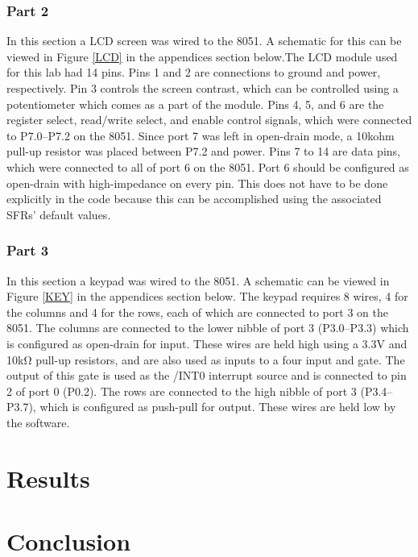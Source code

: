 \documentclass[12pt]{article}
\begin{document}
\subsubsection{Part 2}
In this section a LCD screen was wired to the 8051. A schematic for this can be viewed in Figure \ref{LCD} in the appendices section below.The LCD module used for this lab had 14 pins.
Pins 1 and 2 are connections to ground and power, respectively. Pin 3 controls the screen contrast, which can be controlled using a potentiometer which comes as a part of the module. Pins 4, 5, and 6 are the register select, read/write select, and enable control signals, which were connected to P7.0--P7.2 on the 8051. Since port 7 was left in open-drain mode, a 10k\si{ohm} pull-up resistor was placed between P7.2 and power. Pins 7 to 14 are data pins, which were connected to all of port 6 on the 8051. Port 6 should be configured as open-drain with high-impedance on every pin. This does not have to be done explicitly in the code because this can be accomplished using the associated SFRs' default values.

\subsubsection{Part 3}
In this section a keypad was wired to the 8051. A schematic can be viewed in Figure \ref{KEY} in the appendices section below. The keypad requires 8 wires, 4 for the columns and 4 for the rows, each of which are connected to port 3 on the 8051. The columns are connected to the lower nibble of port 3 (P3.0--P3.3) which is configured as open-drain for input. These wires are held high using a 3.3\si{V} and 10k\si{\ohm} pull-up resistors, and are also used as inputs to a four input and gate. The output of this gate is used as the /INT0 interrupt source and is connected to pin 2 of port 0 (P0.2). The rows are connected to the high nibble of port 3 (P3.4--P3.7), which is configured as push-pull for output. These wires are held low by the software. 

\section{Results}



\section{Conclusion}
 
\end{document}
